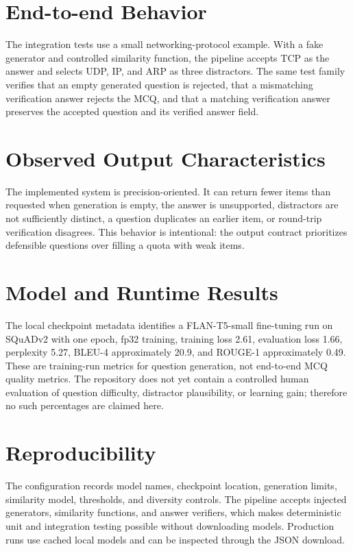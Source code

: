 \documentclass[12pt,a4paper]{report}
\begin{document}
\section{End-to-end Behavior}
The integration tests use a small networking-protocol example. With a fake generator and controlled similarity function, the pipeline accepts TCP as the answer and selects UDP, IP, and ARP as three distractors. The same test family verifies that an empty generated question is rejected, that a mismatching verification answer rejects the MCQ, and that a matching verification answer preserves the accepted question and its verified answer field.

\section{Observed Output Characteristics}
The implemented system is precision-oriented. It can return fewer items than requested when generation is empty, the answer is unsupported, distractors are not sufficiently distinct, a question duplicates an earlier item, or round-trip verification disagrees. This behavior is intentional: the output contract prioritizes defensible questions over filling a quota with weak items.

\section{Model and Runtime Results}
The local checkpoint metadata identifies a FLAN-T5-small fine-tuning run on SQuADv2 with one epoch, fp32 training, training loss 2.61, evaluation loss 1.66, perplexity 5.27, BLEU-4 approximately 20.9, and ROUGE-1 approximately 0.49. These are training-run metrics for question generation, not end-to-end MCQ quality metrics. The repository does not yet contain a controlled human evaluation of question difficulty, distractor plausibility, or learning gain; therefore no such percentages are claimed here.

\section{Reproducibility}
The configuration records model names, checkpoint location, generation limits, similarity model, thresholds, and diversity controls. The pipeline accepts injected generators, similarity functions, and answer verifiers, which makes deterministic unit and integration testing possible without downloading models. Production runs use cached local models and can be inspected through the JSON download.
\end{document}
